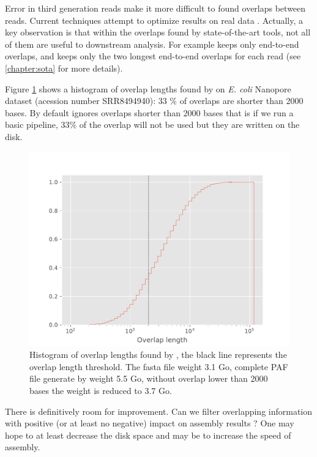 \documentclass[main.tex]{subfiles}
\begin{document}
Error in third generation reads make it more difficult to found overlaps between reads. Current techniques attempt to optimize results on real data \cite{ovl_bench}.
Actually, a key observation is that within the overlaps found by state-of-the-art tools, not all of them are useful to downstream analysis. For example \miniasm keeps only end-to-end overlaps, and \canu keeps only the two longest end-to-end overlaps for each read (see \ref{chapter:sota} for more details).

Figure \ref{intro:fig:length_overlap_histogram} shows a histogram of overlap lengths found by \minimap on \textit{E. coli} Nanopore dataset (acession number SRR8494940): 33 \% of overlaps are shorter than 2000 bases. By default \miniasm ignores overlaps shorter than 2000 bases that is if we run a basic \miniasm pipeline, 33\% of the overlap will not be used but they are written on the disk.  
\begin{figure}
    \centering
    \includegraphics[width=\textwidth]{introduction/images/overlap_length.pdf}
    \caption{Histogram of overlap lengths found by \minimap, the black line represents the \miniasm overlap length threshold. The fasta file weight 3.1 Go, complete PAF file generate by \minimap weight 5.5 Go, without overlap lower than 2000 bases the weight is reduced to 3.7 Go.}
    \label{intro:fig:length_overlap_histogram}
\end{figure}
There is definitively room for improvement. Can we filter overlapping information with positive (or at least no negative) impact on assembly results ? One may hope to at least decrease the disk space and may be to increase the speed of assembly.
\end{document}
